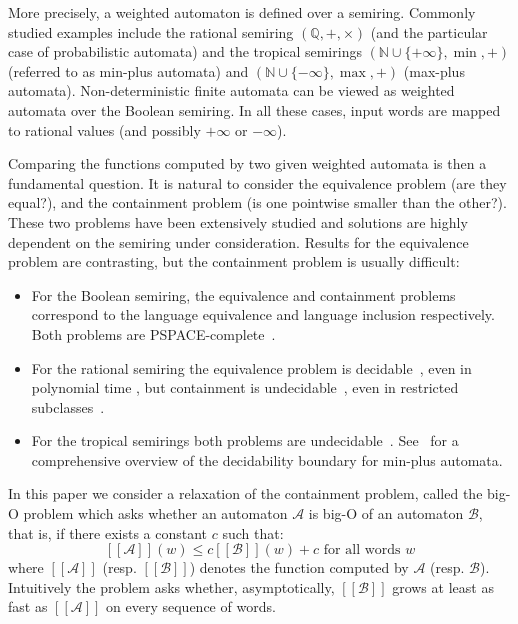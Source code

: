 \documentclass{lmcs}
\theoremstyle{remark}
\newcommand{\autA}{\mathcal{A}}
\newcommand{\autB}{\mathcal{B}}
\newcommand{\brfunc}[1]{[\![#1]\!]}
\newcommand{\funcA}{\brfunc{\autA}}
\newcommand{\funcB}{\brfunc{\autB}}
\theoremstyle{remark}
\begin{document}
More precisely, a weighted automaton is defined over a semiring. Commonly studied examples include the rational semiring $(\mathbb{Q},+,\times)$ (and the particular case of probabilistic automata) and the tropical semirings $(\mathbb{N}\cup\{+\infty\},\min,+)$ (referred to as min-plus automata) and  $(\mathbb{N}\cup\{-\infty\},\max,+)$ (max-plus automata). Non-deterministic finite automata can be viewed as weighted automata over the Boolean semiring. In all these cases, input words are mapped to rational values (and possibly $+\infty$ or $-\infty$).

Comparing the functions computed by two given weighted automata is then a fundamental question. It is natural to consider the equivalence problem (are they equal?), and the containment problem (is one pointwise smaller than the other?). These two problems have been extensively studied and solutions are highly dependent on the semiring under consideration. Results for the equivalence problem are contrasting, but the containment problem is usually difficult:
\begin{itemize}
    \item For the Boolean semiring, the equivalence and containment problems correspond to the language equivalence and language inclusion respectively. Both problems are PSPACE-complete~\cite{StockmeyerM73}.
    \item For the rational semiring the equivalence problem is decidable~\cite{Schutzenberger61b}, even in polynomial time \cite{kiefer13}, but containment is undecidable~\cite{paz2014introduction}, even in restricted subclasses~\cite{DaviaudJLMP021}.
    \item For the tropical semirings both problems are undecidable~\cite{Krob94}. See~\cite{AlmagorBK22,AlmagorBK11} for a comprehensive overview of the decidability boundary for min-plus automata.
\end{itemize}

In this paper we consider a relaxation of the containment problem, called the big-O problem which asks whether an automaton $\autA$ is big-O of an automaton $\autB$, that is, if there exists a constant $c$ such that:
\[
\funcA(w) \le c\funcB(w) + c\text{ for all words } w
\]
where $\funcA$ (resp. $\funcB$) denotes the function computed by $\autA$ (resp. $\autB$).
Intuitively the problem asks whether, asymptotically, $\funcB$ grows at least as fast as $\funcA$ on every sequence of words.
\end{document}
